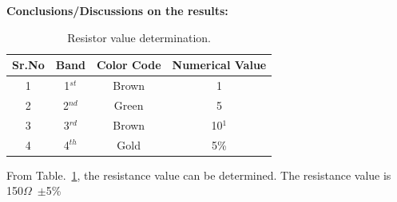 \documentclass[11pt]{scrreprt}
\begin{document}
\noindent\textbf{Conclusions/Discussions on the results:}

\begin{table}[h!]
\centering
\caption{Resistor value determination.}
\begin{tabular}{|c|c|c|c|}
\hline
\textbf{Sr.No} & \textbf{Band} & \textbf{Color Code} & \textbf{Numerical Value}\\ \hline
1 & 1$^{st}$ & Brown & 1  \\ \hline
2 & 2$^{nd}$ & Green & 5  \\ \hline
3 & 3$^{rd}$ & Brown & 10$^1$  \\ \hline
4 & 4$^{th}$ & Gold & 5\%  \\ \hline
\end{tabular}
\label{tab:resistor determination}
\end{table}
From Table.~\ref{tab:resistor determination}, the resistance value can be determined.
The resistance value is 150$\Omega$~$\pm$5\% 
\end{document}
